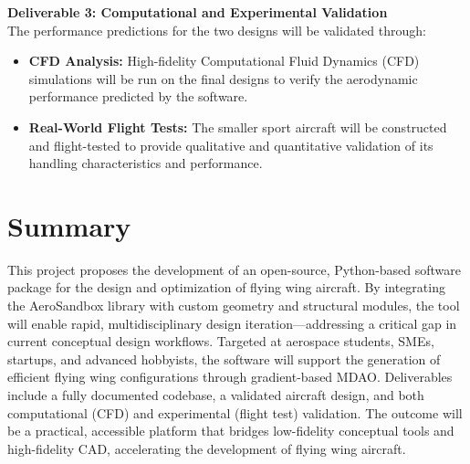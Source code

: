 \documentclass[12pt]{article}
\begin{document}
\textbf{Deliverable 3: Computational and Experimental Validation} \\
The performance predictions for the two designs will be validated through:
\begin{itemize}
    \item \textbf{CFD Analysis:} High-fidelity Computational Fluid Dynamics (CFD) simulations will be run on the final designs to verify the aerodynamic performance predicted by the software.
    \item \textbf{Real-World Flight Tests:} The smaller sport aircraft will be constructed and flight-tested to provide qualitative and quantitative validation of its handling characteristics and performance.
\end{itemize}
\pagebreak
\section{Summary}
This project proposes the development of an open-source, Python-based software package for the design and optimization of flying wing aircraft. By integrating the AeroSandbox library with custom geometry and structural modules, the tool will enable rapid, multidisciplinary design iteration—addressing a critical gap in current conceptual design workflows. Targeted at aerospace students, SMEs, startups, and advanced hobbyists, the software will support the generation of efficient flying wing configurations through gradient-based MDAO. Deliverables include a fully documented codebase, a validated aircraft design, and both computational (CFD) and experimental (flight test) validation. The outcome will be a practical, accessible platform that bridges low-fidelity conceptual tools and high-fidelity CAD, accelerating the development of flying wing aircraft. 
\newpage
\end{document}
